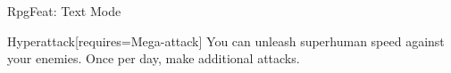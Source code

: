 \begin{ExampleBlock}{RpgFeat: Text Mode}
\begin{RpgFeat}{Hyperattack}[requires={Mega-attack}]
    You can unleash superhuman speed against your enemies. Once per day, make  additional attacks.
\end{RpgFeat}


\end{ExampleBlock}
